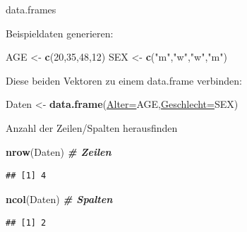 \documentclass[
  ignorenonframetext,
]{beamer}
\newenvironment{Shaded}{\begin{snugshade}}{\end{snugshade}}
\newcommand{\CommentTok}[1]{\textcolor[rgb]{0.00,0.40,1.00}{\textbf{\textit{#1}}}}
\newcommand{\DataTypeTok}[1]{\textcolor[rgb]{0.74,0.68,0.62}{\underline{#1}}}
\newcommand{\DecValTok}[1]{\textcolor[rgb]{0.27,0.67,0.26}{#1}}
\newcommand{\KeywordTok}[1]{\textcolor[rgb]{0.26,0.66,0.93}{\textbf{#1}}}
\newcommand{\NormalTok}[1]{\textcolor[rgb]{0.74,0.68,0.62}{#1}}
\newcommand{\StringTok}[1]{\textcolor[rgb]{0.02,0.61,0.04}{#1}}
\begin{document}
\begin{frame}[fragile]{data.frames}
\protect\hypertarget{data.frames}{}

Beispieldaten generieren:

\begin{Shaded}
\begin{Highlighting}[]
\NormalTok{AGE <-}\StringTok{ }\KeywordTok{c}\NormalTok{(}\DecValTok{20}\NormalTok{,}\DecValTok{35}\NormalTok{,}\DecValTok{48}\NormalTok{,}\DecValTok{12}\NormalTok{)}
\NormalTok{SEX <-}\StringTok{ }\KeywordTok{c}\NormalTok{(}\StringTok{"m"}\NormalTok{,}\StringTok{"w"}\NormalTok{,}\StringTok{"w"}\NormalTok{,}\StringTok{"m"}\NormalTok{)}
\end{Highlighting}
\end{Shaded}

Diese beiden Vektoren zu einem data.frame verbinden:

\begin{Shaded}
\begin{Highlighting}[]
\NormalTok{Daten <-}\StringTok{ }\KeywordTok{data.frame}\NormalTok{(}\DataTypeTok{Alter=}\NormalTok{AGE,}\DataTypeTok{Geschlecht=}\NormalTok{SEX)}
\end{Highlighting}
\end{Shaded}

Anzahl der Zeilen/Spalten herausfinden

\begin{Shaded}
\begin{Highlighting}[]
\KeywordTok{nrow}\NormalTok{(Daten) }\CommentTok{# Zeilen}
\end{Highlighting}
\end{Shaded}

\begin{verbatim}
## [1] 4
\end{verbatim}

\begin{Shaded}
\begin{Highlighting}[]
\KeywordTok{ncol}\NormalTok{(Daten) }\CommentTok{# Spalten}
\end{Highlighting}
\end{Shaded}

\begin{verbatim}
## [1] 2
\end{verbatim}

\end{frame}
\end{document}

